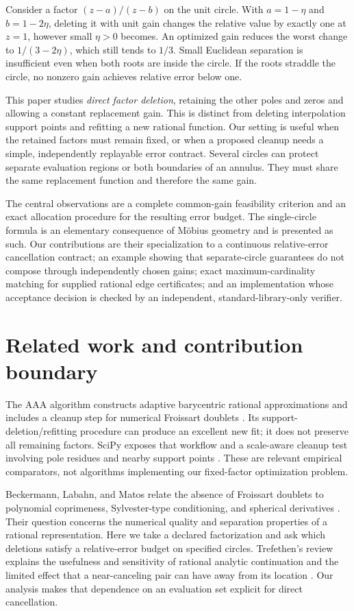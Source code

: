 \documentclass[11pt]{article}
\theoremstyle{definition}\newtheorem{definition}[theorem]{Definition}
\begin{document}
Consider a factor $(z-a)/(z-b)$ on the unit circle. With $a=1-\eta$ and $b=1-2\eta$, deleting it with unit gain changes the relative value by exactly one at $z=1$, however small $\eta>0$ becomes. An optimized gain reduces the worst change to $1/(3-2\eta)$, which still tends to $1/3$. Small Euclidean separation is insufficient even when both roots are inside the circle. If the roots straddle the circle, no nonzero gain achieves relative error below one.

This paper studies \emph{direct factor deletion}, retaining the other poles and zeros and allowing a constant replacement gain. This is distinct from deleting interpolation support points and refitting a new rational function. Our setting is useful when the retained factors must remain fixed, or when a proposed cleanup needs a simple, independently replayable error contract. Several circles can protect separate evaluation regions or both boundaries of an annulus. They must share the same replacement function and therefore the same gain.

The central observations are a complete common-gain feasibility criterion and an exact allocation procedure for the resulting error budget. The single-circle formula is an elementary consequence of M\"obius geometry and is presented as such. Our contributions are their specialization to a continuous relative-error cancellation contract; an example showing that separate-circle guarantees do not compose through independently chosen gains; exact maximum-cardinality matching for supplied rational edge certificates; and an implementation whose acceptance decision is checked by an independent, standard-library-only verifier.

\section{Related work and contribution boundary}
The AAA algorithm constructs adaptive barycentric rational approximations and includes a cleanup step for numerical Froissart doublets \cite{aaa}. Its support-deletion/refitting procedure can produce an excellent new fit; it does not preserve all remaining factors. SciPy exposes that workflow and a scale-aware cleanup test involving pole residues and nearby support points \cite{scipydoc}. These are relevant empirical comparators, not algorithms implementing our fixed-factor optimization problem.

Beckermann, Labahn, and Matos relate the absence of Froissart doublets to polynomial coprimeness, Sylvester-type conditioning, and spherical derivatives \cite{beckermann}. Their question concerns the numerical quality and separation properties of a rational representation. Here we take a declared factorization and ask which deletions satisfy a relative-error budget on specified circles. Trefethen's review explains the usefulness and sensitivity of rational analytic continuation and the limited effect that a near-canceling pair can have away from its location \cite{continuation}. Our analysis makes that dependence on an evaluation set explicit for direct cancellation.
\end{document}
